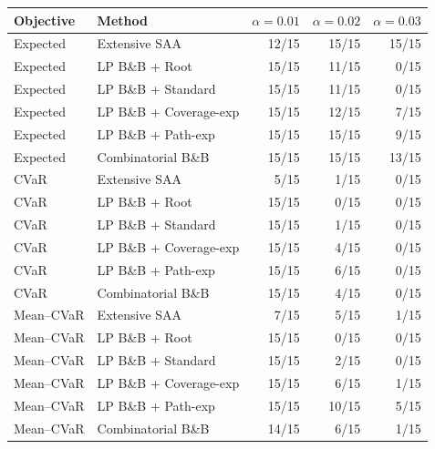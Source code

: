 \begin{tabular}{llrrr}
\toprule
Objective & Method & $\alpha=0.01$ & $\alpha=0.02$ & $\alpha=0.03$ \\
\midrule
Expected & Extensive SAA & 12/15 & 15/15 & 15/15 \\
Expected & LP B\&B + Root & 15/15 & 11/15 & 0/15 \\
Expected & LP B\&B + Standard & 15/15 & 11/15 & 0/15 \\
Expected & LP B\&B + Coverage-exp & 15/15 & 12/15 & 7/15 \\
Expected & LP B\&B + Path-exp & 15/15 & 15/15 & 9/15 \\
Expected & Combinatorial B\&B & 15/15 & 15/15 & 13/15 \\
\midrule
CVaR & Extensive SAA & 5/15 & 1/15 & 0/15 \\
CVaR & LP B\&B + Root & 15/15 & 0/15 & 0/15 \\
CVaR & LP B\&B + Standard & 15/15 & 1/15 & 0/15 \\
CVaR & LP B\&B + Coverage-exp & 15/15 & 4/15 & 0/15 \\
CVaR & LP B\&B + Path-exp & 15/15 & 6/15 & 0/15 \\
CVaR & Combinatorial B\&B & 15/15 & 4/15 & 0/15 \\
\midrule
Mean--CVaR & Extensive SAA & 7/15 & 5/15 & 1/15 \\
Mean--CVaR & LP B\&B + Root & 15/15 & 0/15 & 0/15 \\
Mean--CVaR & LP B\&B + Standard & 15/15 & 2/15 & 0/15 \\
Mean--CVaR & LP B\&B + Coverage-exp & 15/15 & 6/15 & 1/15 \\
Mean--CVaR & LP B\&B + Path-exp & 15/15 & 10/15 & 5/15 \\
Mean--CVaR & Combinatorial B\&B & 14/15 & 6/15 & 1/15 \\
\bottomrule
\end{tabular}

